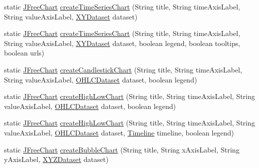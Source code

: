 \begin{DoxyCompactItemize}
\item 
static \mbox{\hyperlink{classorg_1_1jfree_1_1chart_1_1_j_free_chart}{J\+Free\+Chart}} \mbox{\hyperlink{classorg_1_1jfree_1_1chart_1_1_chart_factory_a157513f80cdf35969858f70b00cf9174}{create\+Time\+Series\+Chart}} (String title, String time\+Axis\+Label, String value\+Axis\+Label, \mbox{\hyperlink{interfaceorg_1_1jfree_1_1data_1_1xy_1_1_x_y_dataset}{X\+Y\+Dataset}} dataset)
\item 
static \mbox{\hyperlink{classorg_1_1jfree_1_1chart_1_1_j_free_chart}{J\+Free\+Chart}} \mbox{\hyperlink{classorg_1_1jfree_1_1chart_1_1_chart_factory_ac9a645f43265358ec0e1a0fbcc014683}{create\+Time\+Series\+Chart}} (String title, String time\+Axis\+Label, String value\+Axis\+Label, \mbox{\hyperlink{interfaceorg_1_1jfree_1_1data_1_1xy_1_1_x_y_dataset}{X\+Y\+Dataset}} dataset, boolean legend, boolean tooltips, boolean urls)
\item 
static \mbox{\hyperlink{classorg_1_1jfree_1_1chart_1_1_j_free_chart}{J\+Free\+Chart}} \mbox{\hyperlink{classorg_1_1jfree_1_1chart_1_1_chart_factory_a8b6ad74da39fde8ca5248f54ee6363a1}{create\+Candlestick\+Chart}} (String title, String time\+Axis\+Label, String value\+Axis\+Label, \mbox{\hyperlink{interfaceorg_1_1jfree_1_1data_1_1xy_1_1_o_h_l_c_dataset}{O\+H\+L\+C\+Dataset}} dataset, boolean legend)
\item 
static \mbox{\hyperlink{classorg_1_1jfree_1_1chart_1_1_j_free_chart}{J\+Free\+Chart}} \mbox{\hyperlink{classorg_1_1jfree_1_1chart_1_1_chart_factory_a9ca8c364ef3691f95ae18c8630727b57}{create\+High\+Low\+Chart}} (String title, String time\+Axis\+Label, String value\+Axis\+Label, \mbox{\hyperlink{interfaceorg_1_1jfree_1_1data_1_1xy_1_1_o_h_l_c_dataset}{O\+H\+L\+C\+Dataset}} dataset, boolean legend)
\item 
static \mbox{\hyperlink{classorg_1_1jfree_1_1chart_1_1_j_free_chart}{J\+Free\+Chart}} \mbox{\hyperlink{classorg_1_1jfree_1_1chart_1_1_chart_factory_ad8583bd75a083b800c148d0b17c07d12}{create\+High\+Low\+Chart}} (String title, String time\+Axis\+Label, String value\+Axis\+Label, \mbox{\hyperlink{interfaceorg_1_1jfree_1_1data_1_1xy_1_1_o_h_l_c_dataset}{O\+H\+L\+C\+Dataset}} dataset, \mbox{\hyperlink{interfaceorg_1_1jfree_1_1chart_1_1axis_1_1_timeline}{Timeline}} timeline, boolean legend)
\item 
static \mbox{\hyperlink{classorg_1_1jfree_1_1chart_1_1_j_free_chart}{J\+Free\+Chart}} \mbox{\hyperlink{classorg_1_1jfree_1_1chart_1_1_chart_factory_a073ab1ecdfba456d866be8704185ad98}{create\+Bubble\+Chart}} (String title, String x\+Axis\+Label, String y\+Axis\+Label, \mbox{\hyperlink{interfaceorg_1_1jfree_1_1data_1_1xy_1_1_x_y_z_dataset}{X\+Y\+Z\+Dataset}} dataset)

\end{DoxyCompactItemize}
